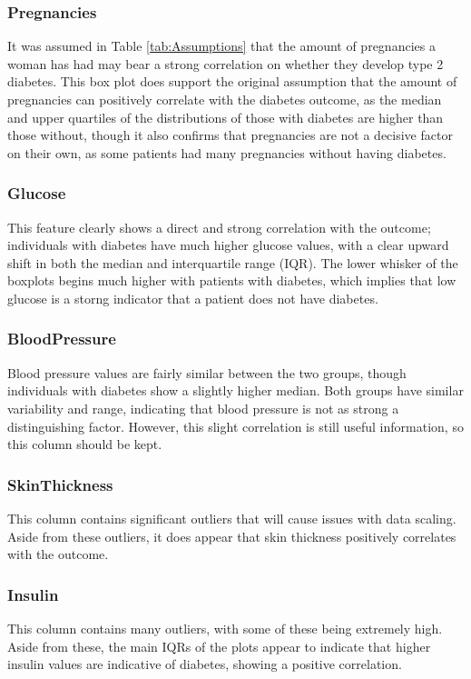 \pagebreak

\subsubsection{Pregnancies}
It was assumed in Table \ref{tab:Assumptions} that the amount of pregnancies a woman has had may bear a strong correlation
on whether they develop type 2 diabetes. This box plot does support the original assumption that the amount of pregnancies can positively 
correlate with the diabetes outcome, as the median and upper quartiles of the distributions of those with 
diabetes are higher than those without, though it also confirms that pregnancies are not a decisive factor 
on their own, as some patients had many pregnancies without having diabetes.

\subsubsection{Glucose}
This feature clearly shows a direct and strong correlation with the outcome; individuals with diabetes have
much higher glucose values, with a clear upward shift in both the median and interquartile range (IQR).
The lower whisker of the boxplots begins much higher with patients with diabetes, which implies that low glucose is a storng 
indicator that a patient does not have diabetes.

\subsubsection{BloodPressure}
Blood pressure values are fairly similar between the two groups, though individuals with diabetes show a slightly higher median.
Both groups have similar variability and range, indicating that blood pressure is not as strong a distinguishing factor. 
However, this slight correlation is still useful information, so this column should be kept. 

\subsubsection{SkinThickness}
This column contains significant outliers that will cause issues with data scaling.
Aside from these outliers, it does appear that skin thickness positively correlates with the outcome.

\subsubsection{Insulin}
This column contains many outliers, with some of these being extremely high. Aside from these, 
the main IQRs of the plots appear to indicate that higher insulin values are indicative of diabetes,
showing a positive correlation.

